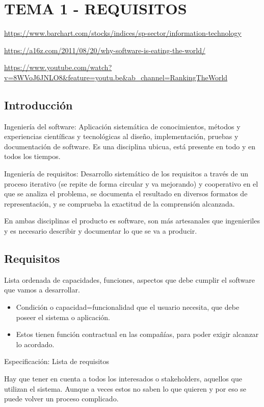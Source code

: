 \documentclass[12pt, twoside, openright]{report} %
\begin{document}
\chapter{TEMA 1 - REQUISITOS}

\url{https://www.barchart.com/stocks/indices/sp-sector/information-technology}

\url{https://a16z.com/2011/08/20/why-software-is-eating-the-world/}

\url{https://www.youtube.com/watch?v=8WVoJ6JNLO8\&feature=youtu.be\&ab_channel=RankingTheWorld}

\section{Introducción}

Ingeniería del software: Aplicación sistemática de conocimientos,
métodos y experiencias científicas y tecnológicas al diseño,
implementación, pruebas y documentación de software. Es una
disciplina ubicua, está presente en todo y en todos los tiempos.

Ingeniería de requisitos: Desarrollo sistemático de los requisitos a
través de un proceso iterativo (se repite de forma circular y va
mejorando) y cooperativo en el que se analiza el problema, se
documenta el resultado en diversos formatos de representación, y se
comprueba la exactitud de la comprensión alcanzada.

En ambas disciplinas el producto es software, son más artesanales
que ingenieriles y es necesario describir y documentar lo que se va
a producir.


\section{Requisitos}

Lista ordenada de capacidades, funciones, aspectos que debe cumplir el
software que vamos a desarrollar.

\begin{itemize}
	\item Condición o capacidad=funcionalidad que el usuario necesita, que
	      debe poseer el sistema o aplicación.
	\item Estos tienen función contractual en las compañías, para poder exigir
	      alcanzar lo acordado.
\end{itemize}
Especificación: Lista de requisitos

Hay que tener en cuenta a todos los interesados o stakeholders,
aquellos que utilizan el sistema. Aunque a veces estos no saben lo
que quieren y por eso se puede volver un proceso complicado.
\pagebreak
\end{document}
